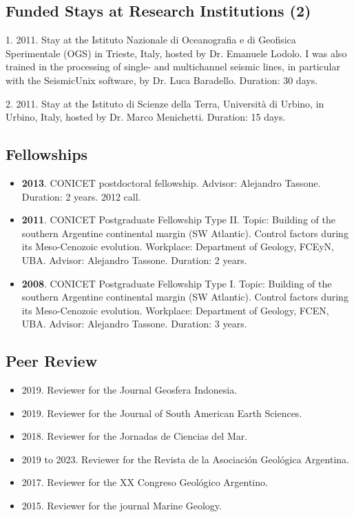 \documentclass[11pt, a4paper]{article}
\begin{document}
\subsection{Funded Stays at Research Institutions (2)}

1. 2011. Stay at the Istituto Nazionale di Oceanografia e di Geofisica Sperimentale (OGS) in Trieste, Italy, hosted by Dr. Emanuele Lodolo. I was also trained in the processing of single- and multichannel seismic lines, in particular with the SeismicUnix software, by Dr. Luca Baradello. Duration: 30 days.

2. 2011. Stay at the Istituto di Scienze della Terra, Università di Urbino, in Urbino, Italy, hosted by Dr. Marco Menichetti. Duration: 15 days.

\subsection{Fellowships}

\begin{itemize}
  \item \textbf{2013}. CONICET postdoctoral fellowship. Advisor: Alejandro Tassone. Duration: 2 years. 2012 call.
  \item \textbf{2011}. CONICET Postgraduate Fellowship Type II. Topic: Building of the southern Argentine continental margin (SW Atlantic). Control factors during its Meso-Cenozoic evolution. Workplace: Department of Geology, FCEyN, UBA. Advisor: Alejandro Tassone. Duration: 2 years.
  \item \textbf{2008}. CONICET Postgraduate Fellowship Type I. Topic: Building of the southern Argentine continental margin (SW Atlantic). Control factors during its Meso-Cenozoic evolution. Workplace: Department of Geology, FCEN, UBA. Advisor: Alejandro Tassone. Duration: 3 years.
\end{itemize}

\subsection{Peer Review}

\begin{itemize}
  \item 2019. Reviewer for the Journal Geosfera Indonesia.
  \item 2019. Reviewer for the Journal of South American Earth Sciences.
  \item 2018. Reviewer for the Jornadas de Ciencias del Mar.
  \item 2019 to 2023. Reviewer for the Revista de la Asociación Geológica Argentina.
  \item 2017. Reviewer for the XX Congreso Geológico Argentino.
  \item 2015. Reviewer for the journal Marine Geology.
\end{itemize}
\end{document}
